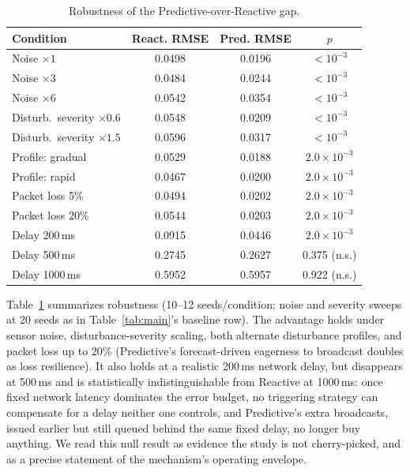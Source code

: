 \documentclass[10pt,conference]{IEEEtran}
\begin{document}
\begin{table}[t]
\centering
\caption{Robustness of the Predictive-over-Reactive gap.}
\label{tab:robust}
\scriptsize
\setlength{\tabcolsep}{3pt}
\begin{tabular}{lccc}
\toprule
Condition & React. RMSE & Pred. RMSE & $p$ \\
\midrule
Noise $\times1$              & 0.0498 & 0.0196 & $<10^{-3}$ \\
Noise $\times3$               & 0.0484 & 0.0244 & $<10^{-3}$ \\
Noise $\times6$               & 0.0542 & 0.0354 & $<10^{-3}$ \\
Disturb.\ severity $\times0.6$ & 0.0548 & 0.0209 & $<10^{-3}$ \\
Disturb.\ severity $\times1.5$ & 0.0596 & 0.0317 & $<10^{-3}$ \\
Profile: gradual              & 0.0529 & 0.0188 & $2.0\times10^{-3}$ \\
Profile: rapid                & 0.0467 & 0.0200 & $2.0\times10^{-3}$ \\
Packet loss 5\%               & 0.0494 & 0.0202 & $2.0\times10^{-3}$ \\
Packet loss 20\%              & 0.0544 & 0.0203 & $2.0\times10^{-3}$ \\
Delay 200\,ms                 & 0.0915 & 0.0446 & $2.0\times10^{-3}$ \\
Delay 500\,ms                 & 0.2745 & 0.2627 & 0.375 (n.s.) \\
Delay 1000\,ms                & 0.5952 & 0.5957 & 0.922 (n.s.) \\
\bottomrule
\end{tabular}
\end{table}

Table~\ref{tab:robust} summarizes robustness (10--12 seeds/condition; noise and severity sweeps at 20 seeds as in Table~\ref{tab:main}'s baseline row). The advantage holds under sensor noise, disturbance-severity scaling, both alternate disturbance profiles, and packet loss up to 20\% (Predictive's forecast-driven eagerness to broadcast doubles as loss resilience). It also holds at a realistic 200\,ms network delay, but disappears at 500\,ms and is statistically indistinguishable from Reactive at 1000\,ms: once fixed network latency dominates the error budget, no triggering strategy can compensate for a delay neither one controls, and Predictive's extra broadcasts, issued earlier but still queued behind the same fixed delay, no longer buy anything. We read this null result as evidence the study is not cherry-picked, and as a precise statement of the mechanism's operating envelope.
\end{document}
